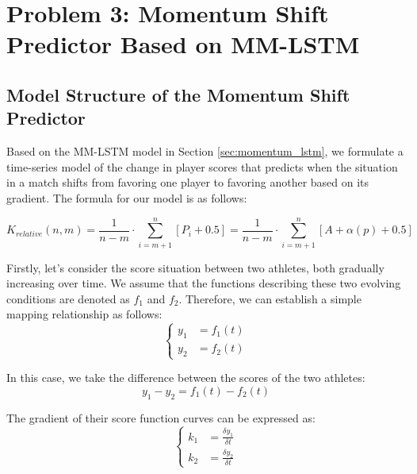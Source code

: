 \section{Problem 3: Momentum Shift Predictor Based on MM-LSTM}

\subsection{Model Structure of the Momentum Shift Predictor}\label{sec:swing_predict_model}
Based on the MM-LSTM model in Section \ref{sec:momentum_lstm}, we formulate a time-series model of the change in player scores that predicts when the situation in a match shifts from favoring one player to favoring another based on its gradient. The formula for our model is as follows:

\begin{equation}
     {K_{relative}}{(n, m)} = \frac{1}{n-m} \cdot \sum_{i=m+1}^{n} [P_i + 0.5] = \frac{1}{n-m} \cdot \sum_{i=m+1}^{n} [A+\alpha (p) + 0.5]
\end{equation}


Firstly, let's consider the score situation between two athletes, both gradually increasing over time. We assume that the functions describing these two evolving conditions are denoted as \(f_{1}\) and \(f_{2}\). Therefore, we can establish a simple mapping relationship as follows:
\begin{equation}
\left\{
\begin{aligned}
    y_{1} &= f_{1}(t) \\
    y_{2} &= f_{2}(t)
\end{aligned}
\right.
\end{equation}

In this case, we take the difference between the scores of the two athletes:
\begin{equation}
    y_1 - y_2  =  f_{1}(t) -  f_{2}(t)
\end{equation}

The gradient of their score function curves can be expressed as:
\begin{equation}
\left\{
\begin{aligned}
    k_1 &= \frac{\delta y_{1}}{\delta t}  \\
    k_2 &= \frac{\delta y_{2}}{\delta t}
\end{aligned}
\right.
\end{equation}


